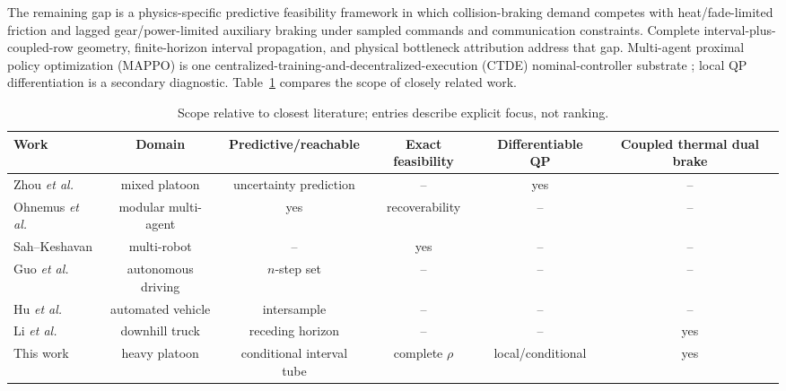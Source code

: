 The remaining gap is a physics-specific predictive feasibility framework in which collision-braking demand competes with heat/fade-limited friction and lagged gear/power-limited auxiliary braking under sampled commands and communication constraints. Complete interval-plus-coupled-row geometry, finite-horizon interval propagation, and physical bottleneck attribution address that gap. Multi-agent proximal policy optimization (MAPPO) is one centralized-training-and-decentralized-execution (CTDE) nominal-controller substrate \cite{yu2022mappo}; local QP differentiation is a secondary diagnostic. Table~\ref{tab:positioning} compares the scope of closely related work.

\begin{table}[t]
\caption{Scope relative to closest literature; entries describe explicit focus, not ranking.}
\label{tab:positioning}
\centering\scriptsize
\begin{tabular}{lccccc}
\toprule
Work & Domain & Predictive/reachable & Exact feasibility & Differentiable QP & Coupled thermal dual brake \\
\midrule
Zhou \emph{et al.} \cite{zhou2026cooperative} & mixed platoon & uncertainty prediction & -- & yes & -- \\
Ohnemus \emph{et al.} \cite{ohnemus2026dpcbf} & modular multi-agent & yes & recoverability & -- & -- \\
Sah--Keshavan \cite{sah2026exact} & multi-robot & -- & yes & -- & -- \\
Guo \emph{et al.} \cite{guo2025uncertainty} & autonomous driving & $n$-step set & -- & -- & -- \\
Hu \emph{et al.} \cite{hu2025event} & automated vehicle & intersample & -- & -- & -- \\
Li \emph{et al.} \cite{li2025retarder} & downhill truck & receding horizon & -- & -- & yes \\
This work & heavy platoon & conditional interval tube & complete $\rho$ & local/conditional & yes \\
\bottomrule
\end{tabular}
\end{table}
